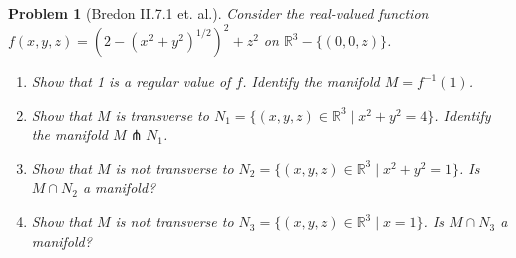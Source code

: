 \documentclass{article}
\newtheorem{plm}{Problem}
\begin{document}
\begin{plm}[Bredon II.7.1 et. al.]
  Consider the real-valued function $f(x, y, z) = (2 - (x^{2} + y^{2})^{1/2})^{2} + z^{2}$ on $\mathbb{R}^{3} - \{(0, 0, z)\}$.
  \begin{enumerate}
  \item Show that 1 is a regular value of $f$.
    Identify the manifold $M = f^{-1}(1)$.
  \item Show that $M$ is transverse to $N_{1} = \{(x, y, z) \in \mathbb{R}^{3} \mid x^{2} + y^{2} = 4\}$.
    Identify the manifold $M \pitchfork N_{1}$.
  \item Show that $M$ is not transverse to $N_{2} = \{(x, y, z) \in \mathbb{R}^{3} \mid x^{2} + y^{2} = 1\}$.
    Is $M \cap N_{2}$ a manifold?
  \item Show that $M$ is not transverse to $N_{3} = \{(x, y, z) \in \mathbb{R}^{3} \mid x = 1\}$.
    Is $M \cap N_{3}$ a manifold?
  \end{enumerate}
\end{plm}
\end{document}
